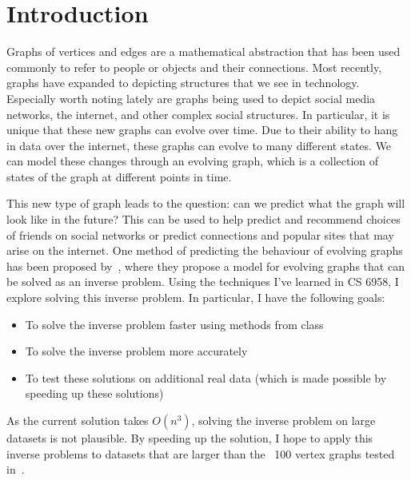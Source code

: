 \section{Introduction}
Graphs of vertices and edges are a mathematical abstraction that has been used commonly to refer to people or objects and their connections.
Most recently, graphs have expanded to depicting structures that we see in technology.
Especially worth noting lately are graphs being used to depict social media networks, the internet, and other complex social structures.
In particular, it is unique that these new graphs can evolve over time.
Due to their ability to hang in data over the internet, these graphs can evolve to many different states.
We can model these changes through an evolving graph, which is a collection of states of the graph at different points in time.

This new type of graph leads to the question: can we predict what the graph will look like in the future?
This can be used to help predict and recommend choices of friends on social networks or predict connections and popular sites
that may arise on the internet.
One method of predicting the behaviour of evolving graphs has been proposed by~\cite{grindrod2009}, where they propose a model
for evolving graphs that can be solved as an inverse problem.
Using the techniques I've learned in CS 6958, I explore solving this inverse problem. In particular, I have the following goals:

\begin{itemize}
	\item To solve the inverse problem faster using methods from class
	\item To solve the inverse problem more accurately
	\item To test these solutions on additional real data (which is made possible by speeding up these solutions)
\end{itemize}

As the current solution takes $O(n^3)$, solving the inverse problem on large datasets is not plausible.
By speeding up the solution, I hope to apply this inverse problems to datasets that are larger than the
~100 vertex graphs tested in~\cite{grindrod2009}.